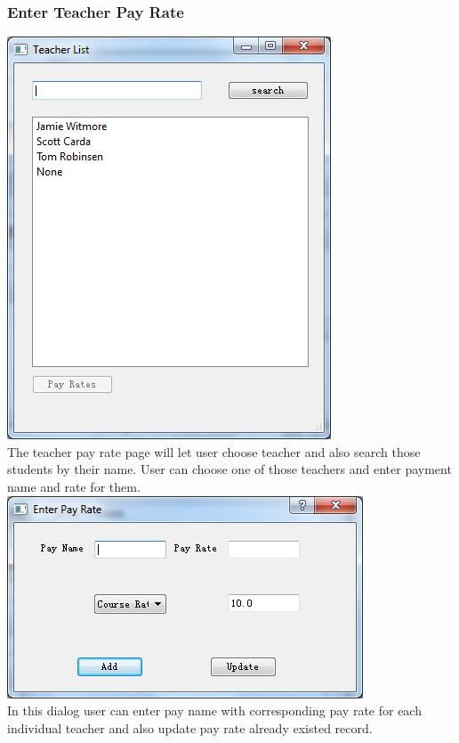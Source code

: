 \subsubsection{Enter Teacher Pay Rate}
\includegraphics[scale=0.5]{pics/pay_rate_main.png}\\
The teacher pay rate page will let user choose teacher and also search those students by their name. User can choose one of those teachers and enter payment name and rate for them.\\
\includegraphics[scale=0.5]{pics/pay_rate_dialog.png}\\
In this dialog user can enter pay name with corresponding pay rate for each individual teacher and also update pay rate already existed record. 

